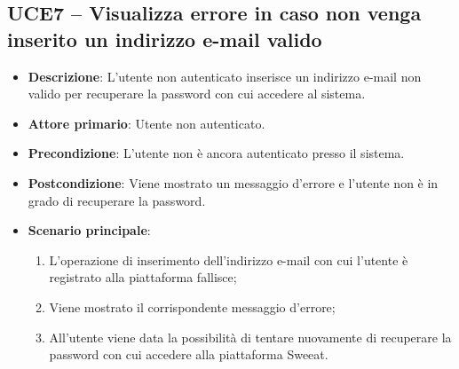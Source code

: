 \subsection{UCE7 – Visualizza errore in caso non venga inserito un indirizzo e-mail valido}
\begin{itemize}
\item \textbf{Descrizione}: L'utente non autenticato inserisce un indirizzo e-mail non valido per recuperare la password con cui accedere al sistema.
\item \textbf{Attore primario}: Utente non autenticato.
\item \textbf{Precondizione}: L'utente non è ancora autenticato presso il sistema.
\item \textbf{Postcondizione}: Viene mostrato un messaggio d'errore e l'utente non è in grado di recuperare la password.

\item \textbf{Scenario principale}:
\begin{enumerate}
\item L'operazione di inserimento dell'indirizzo e-mail con cui l'utente è registrato alla piattaforma fallisce;
\item Viene mostrato il corrispondente messaggio d'errore;
\item All'utente viene data la possibilità di tentare nuovamente di recuperare la password con cui accedere alla piattaforma Sweeat.
\end{enumerate}
\end{itemize}